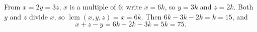 From $x=2y=3z$, $x$ is a multiple of $6$; write $x=6k$, so $y=3k$ and $z=2k$. Both $y$ and $z$ divide $x$, so $\operatorname{lcm}(x,y,z)=x=6k$. Then $6k-3k-2k=k=15$, and
\[
x+z-y=6k+2k-3k=5k=\boxed{75}.
\]
